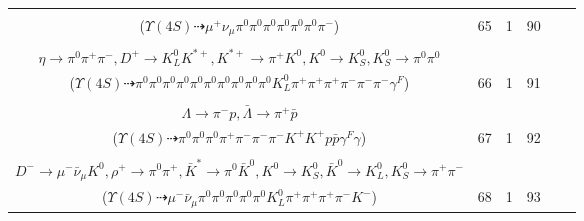 \documentclass[landscape]{article}
\newcounter{rownumbers}
\newcommand\rn{\stepcounter{rownumbers}\arabic{rownumbers}}
\newcommand{\EOLP}{\\ \hline} %
\newcommand{\topoTags}[1]{#1} %
\begin{document}
\begin{longtable}{clcccc}
\rn & \makecell[l]{ $ 
\Upsilon(4S) \rightarrow B^{0} \bar{B}^{0} ,
B^{0} \rightarrow \mu^{+} \nu_{\mu} D^{*-} ,
\bar{B}^{0} \rightarrow \pi^{0} D^{0} ,
D^{*-} \rightarrow \pi^{0} D^{-} ,
D^{0} \rightarrow \pi^{0} \pi^{0} ,
D^{-} \rightarrow \pi^{0} \pi^{0} \pi^{-} 
$ \\ ($
\Upsilon(4S) \dashrightarrow \mu^{+} \nu_{\mu} \pi^{0} \pi^{0} \pi^{0} \pi^{0} \pi^{0} \pi^{0} \pi^{-} 
$) } & \topoTags{65 & }1 & 90 \EOLP

\rn & \makecell[l]{ $ 
\Upsilon(4S) \rightarrow B^{0} \bar{B}^{0} ,
B^{0} \rightarrow \pi^{0} \bar{D}^{0} ,
\bar{B}^{0} \rightarrow \pi^{0} \rho^{0} \pi^{-} \eta \eta D^{+} ,
\bar{D}^{0} \rightarrow \pi^{0} \pi^{0} ,
\rho^{0} \rightarrow \pi^{+} \pi^{-} \gamma^{F} ,
\eta \rightarrow \pi^{0} \pi^{0} \pi^{0} ,
$ \\ $
\eta \rightarrow \pi^{0} \pi^{+} \pi^{-} ,
D^{+} \rightarrow K_{L}^{0} K^{*+} ,
K^{*+} \rightarrow \pi^{+} K^{0} ,
K^{0} \rightarrow K_{S}^{0} ,
K_{S}^{0} \rightarrow \pi^{0} \pi^{0} 
$ \\ ($
\Upsilon(4S) \dashrightarrow \pi^{0} \pi^{0} \pi^{0} \pi^{0} \pi^{0} \pi^{0} \pi^{0} \pi^{0} \pi^{0} \pi^{0} K_{L}^{0} \pi^{+} \pi^{+} \pi^{+} \pi^{-} \pi^{-} \pi^{-} \gamma^{F} 
$) } & \topoTags{66 & }1 & 91 \EOLP

\rn & \makecell[l]{ $ 
\Upsilon(4S) \rightarrow B^{0} \bar{B}^{0} ,
B^{0} \rightarrow K^{+} \Sigma^{0} \bar{\Xi}_{c}^{\prime-} ,
\bar{B}^{0} \rightarrow \pi^{0} D^{0} ,
\Sigma^{0} \rightarrow \Lambda \gamma ,
\bar{\Xi}_{c}^{\prime-} \rightarrow \pi^{-} \pi^{-} K^{+} \bar{\Lambda} \gamma^{F} ,
D^{0} \rightarrow \pi^{0} \pi^{0} ,
$ \\ $
\Lambda \rightarrow \pi^{-} p ,
\bar{\Lambda} \rightarrow \pi^{+} \bar{p} 
$ \\ ($
\Upsilon(4S) \dashrightarrow \pi^{0} \pi^{0} \pi^{0} \pi^{+} \pi^{-} \pi^{-} \pi^{-} K^{+} K^{+} p \bar{p} \gamma^{F} \gamma 
$) } & \topoTags{67 & }1 & 92 \EOLP

\rn & \makecell[l]{ $ 
\Upsilon(4S) \rightarrow \bar{B}^{0} \bar{B}^{0} ,
\bar{B}^{0} \rightarrow \pi^{0} D^{0} ,
\bar{B}^{0} \rightarrow \bar{K}^{*} D^{+} D^{-} ,
D^{0} \rightarrow \pi^{0} \pi^{0} ,
\bar{K}^{*} \rightarrow \pi^{+} K^{-} ,
D^{+} \rightarrow \rho^{+} \bar{K}^{*} ,
$ \\ $
D^{-} \rightarrow \mu^{-} \bar{\nu}_{\mu} K^{0} ,
\rho^{+} \rightarrow \pi^{0} \pi^{+} ,
\bar{K}^{*} \rightarrow \pi^{0} \bar{K}^{0} ,
K^{0} \rightarrow K_{S}^{0} ,
\bar{K}^{0} \rightarrow K_{L}^{0} ,
K_{S}^{0} \rightarrow \pi^{+} \pi^{-} 
$ \\ ($
\Upsilon(4S) \dashrightarrow \mu^{-} \bar{\nu}_{\mu} \pi^{0} \pi^{0} \pi^{0} \pi^{0} \pi^{0} K_{L}^{0} \pi^{+} \pi^{+} \pi^{+} \pi^{-} K^{-} 
$) } & \topoTags{68 & }1 & 93 \EOLP


\end{longtable}
\end{document}
